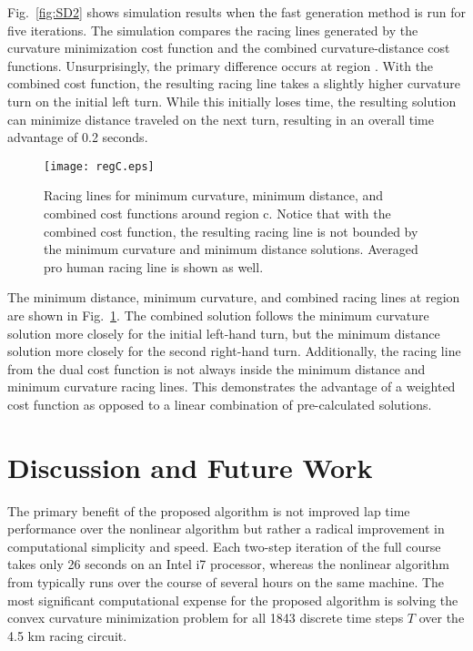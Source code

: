 Fig.~\ref{fig:SD2} shows simulation results when the fast generation method is run for five iterations. The simulation compares the racing lines
 generated by the curvature minimization cost function and the combined curvature-distance cost functions. 
Unsurprisingly, the primary difference occurs at region . With the combined cost function, the resulting racing line takes a slightly higher curvature turn on the initial left turn. While this
initially loses time, the resulting solution can minimize distance traveled on the next turn, resulting in an overall time advantage of 0.2 seconds. 

 \begin{figure}
\centering
\texttt{[image: regC.eps]}
\caption[Racing lines for minimum curvature, minimum distance, and combined cost functions around region c.]{Racing lines for minimum curvature, minimum distance, and combined cost functions around region c. Notice that with the combined cost function,
the resulting racing line is not bounded by the minimum curvature and minimum distance solutions. Averaged pro human racing line is shown as well.}
\label{fig:regC}
\end{figure}

The minimum distance,
minimum curvature, and combined racing lines at region  are shown in Fig.~\ref{fig:regC}. The combined solution follows the minimum curvature solution more
closely for the initial left-hand turn, but the minimum distance solution more closely for the second right-hand turn. Additionally, the racing line
from the dual cost function is not always inside the minimum distance and minimum curvature racing lines. This demonstrates the advantage of a weighted cost function
as opposed to a linear combination of pre-calculated solutions.  

\section{Discussion and Future Work}
\label{sec:DISCUSSION}

The primary benefit of the proposed algorithm is not improved lap time performance
over the nonlinear algorithm but rather a radical improvement in computational simplicity and speed. Each two-step iteration of the full
course takes only 26 seconds on an Intel i7 processor, whereas the nonlinear algorithm from \cite{theodosis} typically runs over the course of several hours on the same
machine. The most significant computational expense for the proposed algorithm is solving the convex curvature minimization problem for
all 1843 discrete time steps $T$ over the 4.5 km racing circuit.

